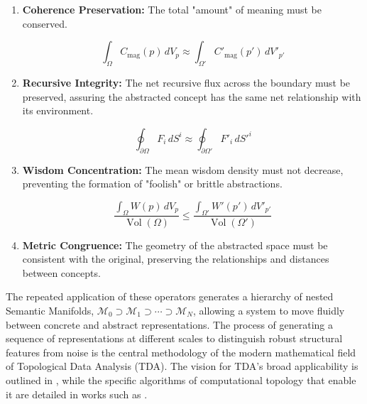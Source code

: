 \begin{enumerate}

    \item \textbf{Coherence Preservation:} The total "amount" of meaning must be conserved.

    \begin{equation}
    \int_{\Omega} C_{\text{mag}}(p) \, dV_p \approx \int_{\Omega'} C'_{\text{mag}}(p') \, dV'_{p'}
    \end{equation}

    \item \textbf{Recursive Integrity:} The net recursive flux across the boundary must be preserved, assuring the abstracted concept has the same net relationship with its environment.

    \begin{equation}
    \oint_{\partial \Omega} F_i \, dS^i \approx \oint_{\partial \Omega'} F'_i \, dS'^i
    \end{equation}

    \item \textbf{Wisdom Concentration:} The mean wisdom density must not decrease, preventing the formation of "foolish" or brittle abstractions.

    \begin{equation}
    \frac{\int_{\Omega} W(p) \, dV_p}{\operatorname{Vol}(\Omega)} \leq \frac{\int_{\Omega'} W'(p') \, dV'_{p'}}{\operatorname{Vol}(\Omega')}
    \end{equation}

    \item \textbf{Metric Congruence:} The geometry of the abstracted space must be consistent with the original, preserving the relationships and distances between concepts.
\end{enumerate}

The repeated application of these operators generates a hierarchy of nested Semantic Manifolds, \(\mathcal{M}_0 \supset \mathcal{M}_1 \supset \cdots \supset \mathcal{M}_N\), allowing a system to move fluidly between concrete and abstract representations. The process of generating a sequence of representations at different scales to distinguish robust structural features from noise is the central methodology of the modern mathematical field of Topological Data Analysis (TDA). The vision for TDA's broad applicability is outlined in \textcite{Carlsson2009}, while the specific algorithms of computational topology that enable it are detailed in works such as \textcite{EdelsbrunnerHarer2010}.

